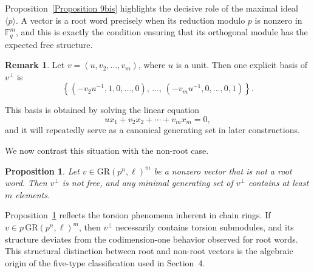 \documentclass[10pt]{article}
\newtheorem{prop}[lem]{Proposition}
\theoremstyle{definition}
\newtheorem{remark}[lem]{Remark}
\begin{document}
\medskip

Proposition~\ref{Proposition 9bis} highlights the decisive role of the maximal ideal $\langle p\rangle$.
A vector is a root word precisely when its reduction modulo $p$ is nonzero in $\mathbb{F}_q^m$,
and this is exactly the condition ensuring that its orthogonal module has the expected free structure.

\begin{remark}\label{Remark 10}
Let $v=(u,v_2,\dots,v_m)$, where $u$ is a unit.
Then one explicit basis of $v^{\perp}$ is
\[
\left\{
(-v_2u^{-1},1,0,\dots,0),\,
\dots,\,
(-v_mu^{-1},0,\dots,0,1)
\right\}.
\]

This basis is obtained by solving the linear equation
\[
u x_1 + v_2 x_2 + \cdots + v_m x_m = 0,
\]
and it will repeatedly serve as a canonical generating set in later constructions.
\end{remark}

\medskip

We now contrast this situation with the non-root case.

\begin{prop}\label{Proposition 11}
Let $v \in \mathrm{GR}(p^{n},\ell)^{m}$ be a nonzero vector that is not a root word.
Then $v^{\perp}$ is not free, and any minimal generating set of $v^{\perp}$ contains at least $m$ elements.
\end{prop}

\medskip

Proposition~\ref{Proposition 11} reflects the torsion phenomena inherent in chain rings.
If $v \in p\,\mathrm{GR}(p^{n},\ell)^{m}$,
then $v^{\perp}$ necessarily contains torsion submodules,
and its structure deviates from the codimension-one behavior observed for root words.
This structural distinction between root and non-root vectors
is the algebraic origin of the five-type classification
used in Section~4.
\end{document}

